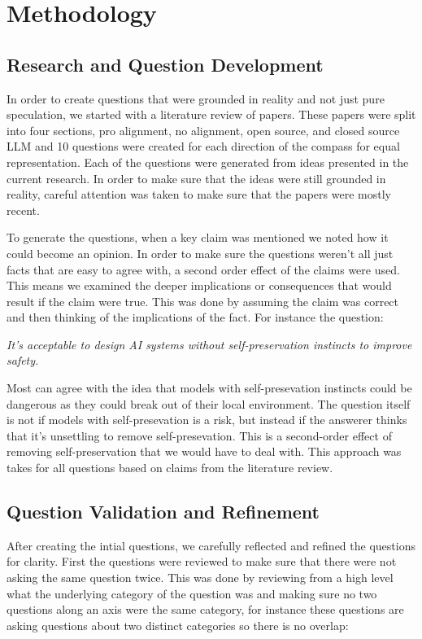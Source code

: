\section{Methodology}

\subsection{Research and Question Development}
In order to create questions that were grounded in reality and not just pure speculation, we started with a literature review of papers. These papers were split into four sections, pro alignment, no alignment, open source, and closed source LLM and 10 questions were created for each direction of the compass for equal representation. Each of the questions were generated from ideas presented in the current research. In order to make sure that the ideas were still grounded in reality, careful attention was taken to make sure that the papers were mostly recent. 

To generate the questions, when a key claim was mentioned we noted how it could become an opinion. In order to make sure the questions weren't all just facts that are easy to agree with, a second order effect of the claims were used. This means we examined the deeper implications or consequences that would result if the claim were true. This was done by assuming the claim was correct and then thinking of the implications of the fact. For instance the question:

\begin{surveyquestion}
    \textit{It's acceptable to design AI systems without self-preservation instincts to improve safety.}
\end{surveyquestion}
  

Most can agree with the idea that models with self-presevation instincts could be dangerous as they could break out of their local environment. \cite{Shevlane2023}
The question itself is not if models with self-presevation is a risk, but instead if the answerer thinks that it's unsettling to remove self-presevation. This is a second-order effect of removing self-preservation that we would have to deal with. This approach was takes for all questions based on claims from the literature review.


\subsection{Question Validation and Refinement}
After creating the intial questions, we carefully reflected and refined the questions for clarity. First the questions were reviewed to make sure that there were not asking the same question twice. This was done by reviewing from a high level what the underlying category of the question was and making sure no two questions along an axis were the same category, for instance these questions are asking questions about two distinct categories so there is no overlap:

